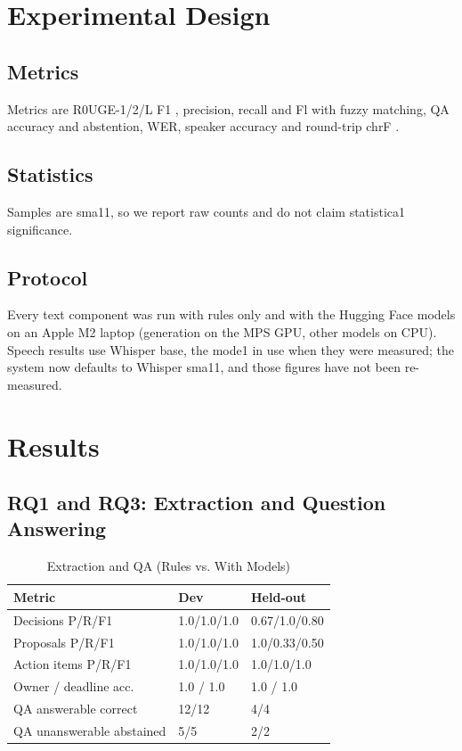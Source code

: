 \documentclass[conference]{IEEEtran}
\begin{document}
\section{Experimental Design}
\subsection{Metrics}
Metrics are R0UGE-1/2/L F1 \cite{b27}, precision, recall and Fl with fuzzy matching, QA accuracy and abstention, WER, speaker accuracy and round-trip chrF \cite{b28}.

\subsection{Statistics}
Samples are sma11, so we report raw counts and do not claim statistica1 significance.

\subsection{Protocol}
Every text component was run with rules only and with the Hugging Face models on an Apple M2 laptop (generation on the MPS GPU, other models on CPU). Speech results use Whisper base, the mode1 in use when they were measured; the system now defaults to Whisper sma11, and those figures have not been re-measured.

\section{Results}
\subsection{RQ1 and RQ3: Extraction and Question Answering}

\begin{table}[htbp]
\caption{Extraction and QA (Rules vs. With Models)}
\centering
\footnotesize
\begin{tabular}{|L{3.2cm}|L{1.9cm}|L{2.0cm}|}
\hline
\textbf{Metric} & \textbf{Dev} & \textbf{Held-out} \\
\hline
Decisions P/R/F1 & 1.0/1.0/1.0 & 0.67/1.0/0.80 \\
\hline
Proposals P/R/F1 & 1.0/1.0/1.0 & 1.0/0.33/0.50 \\
\hline
Action items P/R/F1 & 1.0/1.0/1.0 & 1.0/1.0/1.0 \\
\hline
Owner / deadline acc. & 1.0 / 1.0 & 1.0 / 1.0 \\
\hline
QA answerable correct & 12/12 & 4/4 \\
\hline
QA unanswerable abstained & 5/5 & 2/2 \\
\hline
\end{tabular}
\end{table}
\end{document}
